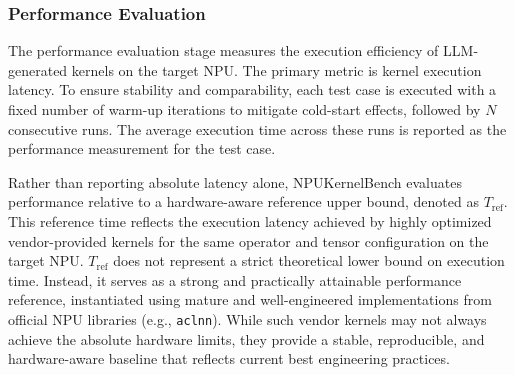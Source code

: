 
%

\subsubsection{Performance Evaluation}

The performance evaluation stage measures the execution efficiency of LLM-generated kernels on the target NPU. The primary metric is kernel execution latency. To ensure stability and comparability, each test case is executed with a fixed number of warm-up iterations to mitigate cold-start effects, followed by $N$ consecutive runs. The average execution time across these runs is reported as the performance measurement for the test case.

Rather than reporting absolute latency alone, NPUKernelBench evaluates performance relative to a hardware-aware reference upper bound, denoted as $T_{\text{ref}}$. This reference time reflects the execution latency achieved by highly optimized vendor-provided kernels for the same operator and tensor configuration on the target NPU. $T_{\text{ref}}$ does not represent a strict theoretical lower bound on execution time. Instead, it serves as a strong and practically attainable performance reference, instantiated using mature and well-engineered implementations from official NPU libraries (e.g., \texttt{aclnn}). While such vendor kernels may not always achieve the absolute hardware limits, they provide a stable, reproducible, and hardware-aware baseline that reflects current best engineering practices.

